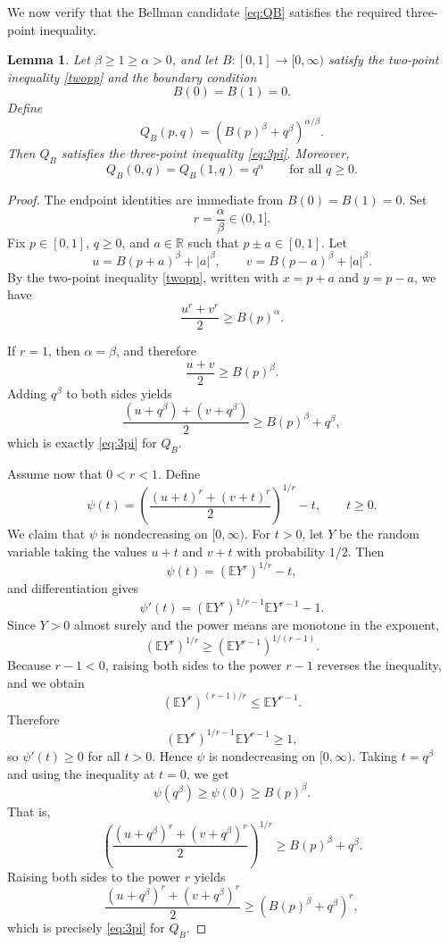 \documentclass[11pt]{amsart}
\newtheorem{lemma}[theorem]{Lemma}
\theoremstyle{definition}
\renewcommand{\1}{{\mathbbm{1}}}
\begin{document}
We now verify that the Bellman candidate \eqref{eq:QB} satisfies the required three-point inequality.

\begin{lemma}\label{lem:u3pt}
Let $\beta\ge1\ge\alpha>0$, and let $B:[0,1]\to[0,\infty)$ satisfy the
two-point inequality \eqref{twopp} and the boundary condition
\[
B(0)=B(1)=0.
\]
Define
\begin{equation}\label{eq:QB}
Q_B(p,q)=\left(B(p)^\beta+q^\beta\right)^{\alpha/\beta}.
\end{equation}
Then $Q_B$ satisfies the three-point inequality \eqref{eq:3pi}. Moreover,
\[
Q_B(0,q)=Q_B(1,q)=q^\alpha
\qquad \text{for all } q\ge0.
\]
\end{lemma}

\begin{proof}
The endpoint identities are immediate from $B(0)=B(1)=0$.
Set
\[
r=\frac{\alpha}{\beta}\in(0,1].
\]
Fix $p\in[0,1]$, $q\ge0$, and $a\in\mathbb R$ such that $p\pm a\in[0,1]$.
Let
\[
u=B(p+a)^\beta+|a|^\beta,
\qquad
v=B(p-a)^\beta+|a|^\beta.
\]
By the two-point inequality \eqref{twopp}, written with $x=p+a$ and
$y=p-a$, we have
\[
\frac{u^r+v^r}{2}\ge B(p)^\alpha.
\]

If $r=1$, then $\alpha=\beta$, and therefore
\[
\frac{u+v}{2}\ge B(p)^\beta.
\]
Adding $q^\beta$ to both sides yields
\[
\frac{(u+q^\beta)+(v+q^\beta)}{2}
\ge
B(p)^\beta+q^\beta,
\]
which is exactly \eqref{eq:3pi} for $Q_B$.

Assume now that $0<r<1$. Define
\[
\psi(t)=\left(\frac{(u+t)^r+(v+t)^r}{2}\right)^{1/r}-t,
\qquad t\ge0.
\]
We claim that $\psi$ is nondecreasing on $[0,\infty)$.
For $t>0$, let $Y$ be the random variable taking the values $u+t$ and
$v+t$ with probability $1/2$. Then
\[
\psi(t)=\left(\mathbb E Y^r\right)^{1/r}-t,
\]
and differentiation gives
\[
\psi'(t)
=
\left(\mathbb E Y^r\right)^{1/r-1}\mathbb E Y^{r-1}-1.
\]
Since $Y>0$ almost surely and the power means are monotone in the exponent,
\[
\left(\mathbb E Y^r\right)^{1/r}
\ge
\left(\mathbb E Y^{r-1}\right)^{1/(r-1)}.
\]
Because $r-1<0$, raising both sides to the power $r-1$ reverses the
inequality, and we obtain
\[
\left(\mathbb E Y^r\right)^{(r-1)/r}
\le
\mathbb E Y^{r-1}.
\]
Therefore
\[
\left(\mathbb E Y^r\right)^{1/r-1}\mathbb E Y^{r-1}\ge1,
\]
so $\psi'(t)\ge0$ for all $t>0$. Hence $\psi$ is nondecreasing on
$[0,\infty)$.
Taking $t=q^\beta$ and using the inequality at $t=0$, we get
\[
\psi(q^\beta)\ge \psi(0)\ge B(p)^\beta.
\]
That is,
\[
\left(
\frac{(u+q^\beta)^r+(v+q^\beta)^r}{2}
\right)^{1/r}
\ge
B(p)^\beta+q^\beta.
\]
Raising both sides to the power $r$ yields
\[
\frac{(u+q^\beta)^r+(v+q^\beta)^r}{2}
\ge
\left(B(p)^\beta+q^\beta\right)^r,
\]
which is precisely \eqref{eq:3pi} for $Q_B$.
\end{proof}
\end{document}
